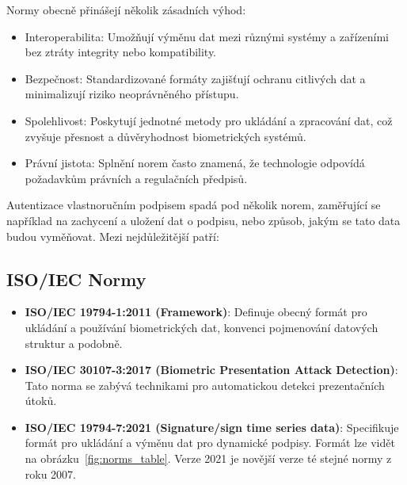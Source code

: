 Normy obecně přinášejí několik zásadních výhod:
\begin{itemize}
  \item Interoperabilita: Umožňují výměnu dat mezi různými systémy a zařízeními bez ztráty integrity nebo kompatibility.
  \item Bezpečnost: Standardizované formáty zajišťují ochranu citlivých dat a minimalizují riziko neoprávněného přístupu.
  \item Spolehlivost: Poskytují jednotné metody pro ukládání a zpracování dat, což zvyšuje přesnost a důvěryhodnost biometrických systémů.
  \item Právní jistota: Splnění norem často znamená, že technologie odpovídá požadavkům právních a regulačních předpisů.
\end{itemize}

Autentizace vlastnoručním podpisem spadá pod několik norem, zaměřující se například na zachycení a uložení dat o podpisu, nebo způsob, jakým se tato data budou vyměňovat. 
Mezi nejdůležitější patří:

\subsection*{ISO/IEC Normy}
\begin{itemize}
  \item \textbf{ISO/IEC 19794-1:2011 (Framework)}: 
  Definuje obecný formát pro ukládání a používání biometrických dat, konvenci pojmenování datových struktur a podobně. %

  \item \textbf{ISO/IEC 30107-3:2017 (Biometric Presentation Attack Detection)}: 
  Tato norma se zabývá technikami pro automatickou detekci prezentačních útoků. %

  \item \textbf{ISO/IEC 19794-7:2021 (Signature/sign time series data)}:
  Specifikuje formát pro ukládání a výměnu dat pro dynamické podpisy. 
  Formát lze vidět na obrázku~\ref{fig:norms_table}. 
  Verze 2021 je novější verze té stejné normy z roku 2007. %
\end{itemize}

